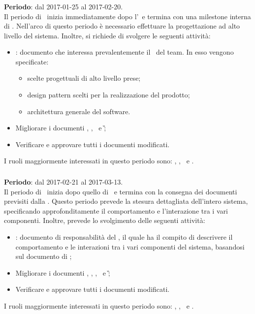 		\subsubsection{\PA}
		\textbf{Periodo}: dal 2017-01-25 al 2017-02-20.\\
		Il periodo di \PA\ inizia immediatamente dopo l'\AR\ e termina con una milestone interna di \RPMin. Nell'arco di questo periodo è necessario effettuare la progettazione ad alto livello del sistema. Inoltre, si richiede di svolgere le seguenti attività:
		\begin{itemize}
			\item \textit{\ST}: documento che interessa prevalentemente il \Prog\ del team. In esso vengono specificate:
			\begin{itemize}
				\item scelte progettuali di alto livello prese;
				\item design pattern scelti per la realizzazione del prodotto;
				\item architettura generale del software.
			\end{itemize}
			\item Migliorare i documenti \NdP, \PdP, \PdQ\ e \G;
			\item Verificare e approvare tutti i documenti modificati.
		\end{itemize}
		I ruoli maggiormente interessati in questo periodo sono: \Amm, \Res, \Prog\ e \Ver.
	
		\subsubsection{\PD}
		\textbf{Periodo}: dal 2017-02-21 al 2017-03-13.\\
		Il periodo di \PD\ inizia dopo quello di \PA\ e termina con la consegna dei documenti previsiti dalla \RP. Questo periodo prevede la stesura dettagliata dell’intero sistema, specificando approfonditamente
		il comportamento e l’interazione tra i vari componenti.
		Inoltre, prevede lo svolgimento delle seguenti attività:
		\begin{itemize}
			\item \textit{\DDP}: documento di responsabilità del \Prog, il quale ha il compito di descrivere il comportamento	e le interazioni tra i vari componenti del sistema, basandosi sul documento di \ST;
			\item  Migliorare i documenti \NdP, \PdP, \PdQ, \ST\ e \G;
			\item Verificare e approvare tutti i documenti modificati.
		\end{itemize}
		I ruoli maggiormente interessati in questo periodo sono: \Amm, \Res, \Prog\ e \Ver.
		
